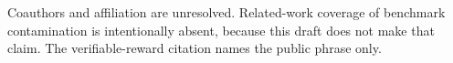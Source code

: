 Coauthors and affiliation are unresolved.
Related-work coverage of benchmark contamination is intentionally absent, because this draft does not make that claim.
The verifiable-reward citation names the public phrase only.
